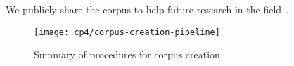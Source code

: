 We publicly share the corpus to help future research in the field~\cite{supplementary_material}.



\begin{figure}
    \centering
    \texttt{[image: cp4/corpus-creation-pipeline]}
    \caption{Summary of procedures for corpus creation}
    \label{fig:corpus-creation-pipeline}
\end{figure}



% 

% 

% 

% 



